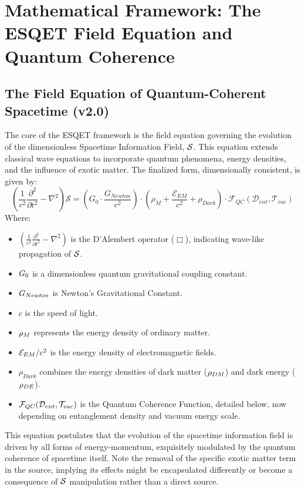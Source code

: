 \chapter{Mathematical Framework: The ESQET Field Equation and Quantum Coherence}
\label{ch:mathematical_framework}

\section{The Field Equation of Quantum-Coherent Spacetime (v2.0)}
The core of the ESQET framework is the field equation governing the evolution of the dimensionless Spacetime Information Field, $\mathcal{S}$. This equation extends classical wave equations to incorporate quantum phenomena, energy densities, and the influence of exotic matter. The finalized form, dimensionally consistent, is given by:
\begin{equation}
    \boxed{\left( \frac{1}{c^2} \frac{\partial^2}{\partial t^2} - \nabla^2 \right) \mathcal{S} = \left( G_0 \cdot \frac{G_{Newton}}{c^2} \right) \cdot \left( \rho_{M} + \frac{\mathcal{E}_{EM}}{c^2} + \rho_{Dark} \right) \cdot \mathcal{F}_{QC}(\mathcal{D}_{ent}, \mathcal{T}_{vac})}
    \label{eq:field_equation}
\end{equation}
Where:
\begin{itemize}[noitemsep]
    \item $\left( \frac{1}{c^2} \frac{\partial^2}{\partial t^2} - \nabla^2 \right)$ is the D'Alembert operator ($\Box$), indicating wave-like propagation of $\mathcal{S}$.
    \item $G_0$ is a dimensionless quantum gravitational coupling constant.
    \item $G_{Newton}$ is Newton's Gravitational Constant.
    \item $c$ is the speed of light.
    \item $\rho_{M}$ represents the energy density of ordinary matter.
    \item $\mathcal{E}_{EM}/c^2$ is the energy density of electromagnetic fields.
    \item $\rho_{Dark}$ combines the energy densities of dark matter ($\rho_{DM}$) and dark energy ($\rho_{DE}$).
    \item $\mathcal{F}_{QC}(\mathcal{D}_{ent}, \mathcal{T}_{vac})$ is the Quantum Coherence Function, detailed below, now depending on entanglement density and vacuum energy scale.
\end{itemize}
This equation postulates that the evolution of the spacetime information field is driven by all forms of energy-momentum, exquisitely modulated by the quantum coherence of spacetime itself. Note the removal of the specific exotic matter term in the source, implying its effects might be encapsulated differently or become a consequence of $\mathcal{S}$ manipulation rather than a direct source.

